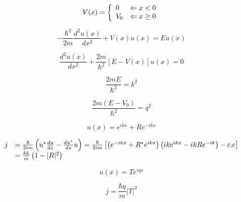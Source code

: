 \documentclass[a4paper,12pt, twoside]{article}
\begin{document}
\begin{equation}
V ( x )  = \left\{ 
\begin{array} { l l } 
{ 0 } & {\Leftarrow x < 0 } \\ 
{ V _ { 0 } } & {\Leftarrow x \geq 0 } 
\end{array} \right. 
\end{equation}

\begin{equation}
- \frac { \hbar ^ { 2 } } { 2 m } \frac { d ^ { 2 } u ( x ) } { d x ^ { 2 } } + V ( x ) u ( x ) = E u ( x )
\end{equation}


\begin{equation}
\frac { d ^ { 2 } u ( x ) } { d x ^ { 2 } } + \frac { 2 m } { \hbar ^ { 2 } } [ E - V ( x ) ] u ( x ) = 0
\end{equation}


\begin{equation}
\frac { 2 m E } { \hbar ^ { 2 } } = k ^ { 2 }
\end{equation}


\begin{equation}
\frac { 2 m \left( E - V _ { 0 } \right) } { \hbar ^ { 2 } } = q ^ { 2 }
\end{equation}


\begin{equation}
u ( x ) = e ^ { i k x } + R e ^ { - i k x }
\end{equation}


\begin{equation}
\begin{array} { r l } 
{ j } & { = \frac { \hbar } { 2 i m } \left( u ^ { * } \frac { d u } { d x } - \frac { d u ^ { * } } { d x } u \right) = \frac { \hbar } { 2 i m } \left[ \left( e ^ { - i k x } + R ^ { * } e ^ { i k x } \right) \left( i k e ^ { i k x } - i k R e ^ { - i k } \right) - c . c \right] } \\ 
{ } & { = \frac { \hbar k } { m } \left( 1 - | R | ^ { 2 } \right) } \end{array}
\end{equation}

\begin{equation}
u ( x ) = T e ^ { i q x }
\end{equation}





\begin{equation}
j = \frac { \hbar q } { m } | T | ^ { 2 }
\end{equation}
\end{document}
